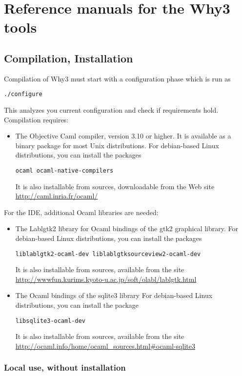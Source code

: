 \chapter{Reference manuals for the Why3 tools}
\label{chap:manpages}

\section{Compilation, Installation}
\label{sec:install}

Compilation of Why3 must start with a configuration phase which is run as
\begin{verbatim}
./configure
\end{verbatim}
This analyzes you current configuration and check if requirements hold.
Compilation requires:
\begin{itemize}
\item The Objective Caml compiler, version 3.10 or higher. It is
  available as a binary package for most Unix distributions. For
  debian-based Linux distributions, you can install the packages
\begin{verbatim}
ocaml ocaml-native-compilers
\end{verbatim}
It is also installable from sources, downloadable from the Web site
\url{http://caml.inria.fr/ocaml/}
\end{itemize}

For the IDE, additional Ocaml libraries are needed:
\begin{itemize}
\item The Lablgtk2 library for Ocaml bindings of the gtk2 graphical library.
 For debian-based Linux distributions, you can install the packages
\begin{verbatim}
liblablgtk2-ocaml-dev liblablgtksourceview2-ocaml-dev
\end{verbatim}
It is also installable from sources, available from the site \url{http://wwwfun.kurims.kyoto-u.ac.jp/soft/olabl/lablgtk.html}

\item The Ocaml bindings of the sqlite3 library
For debian-based Linux distributions, you can install the package
\begin{verbatim}
libsqlite3-ocaml-dev
\end{verbatim}
It is also installable from sources, available from the site
\url{http://ocaml.info/home/ocaml_sources.html#ocaml-sqlite3}
\end{itemize}

\subsection{Local use, without installation}

